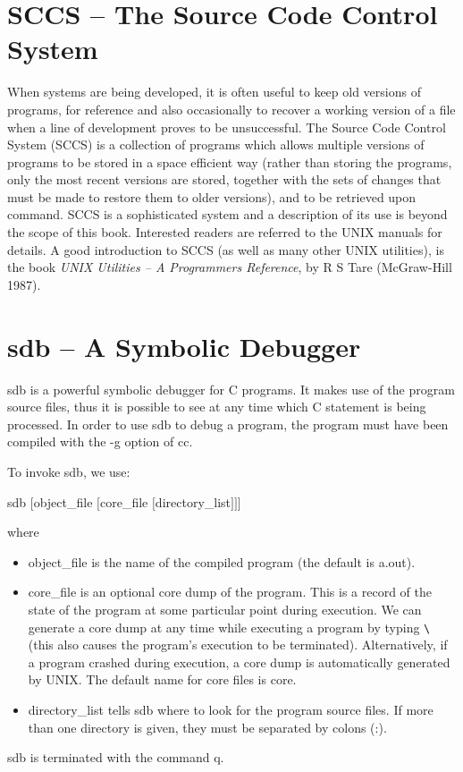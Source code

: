 \section{{\cmd SCCS} -- The Source Code Control System}
When systems are being developed, it is often useful to keep
old versions of programs, for reference and also occasionally to
recover a working version of a file when a line of development proves
to be unsuccessful. The Source Code Control System (SCCS) is a
collection of programs which allows multiple versions of programs to
be stored in a space efficient way (rather than storing the programs,
only the most recent versions are stored, together with the sets of
changes that must be made to restore them to older versions), and
to be retrieved upon command. SCCS is a sophisticated system and a
description of its use is beyond the scope of this book. Interested
readers are referred to the UNIX manuals for details. A good
introduction to SCCS (as well as many other UNIX utilities), is the
book {\em UNIX Utilities -- A Programmers Reference}, by R S Tare
(McGraw-Hill 1987).

\section{{\cmd sdb} -- A Symbolic Debugger}
     {\cmd sdb} is  a powerful  symbolic debugger for C programs. It
makes use of the program source  files, thus  it is possible to see
at any time which C statement is being processed. In order to  use
{\cmd sdb} to debug a program, the program must have been compiled
with the {\cmd -g} option of {\cmd cc.}

     To invoke {\cmd sdb}, we use:
\begin{display}\cmd
sdb $[${\ms object\_file\/} $[${\ms core\_file\/} $[${\ms directory\_list\/}$]]]$
\end{display}
\noindent
where
\begin{itemize}
\item[]  {\ms object\_file\/} is the name of the compiled program (the
default is {\fn a.out}).
\item[]  {\ms core\_file\/}  is an optional core dump of the program.
This is a record of the state  of the  program at  some particular
point during execution. We can generate a  core dump  at any  time
while executing a program by typing \CTRL \verb+\+ (this also  causes
the program's execution to be terminated). Alternatively, if a program
crashed  during execution,  a core  dump is automatically generated
by UNIX. The default name for core files is {\fn core}.
\item[]   {\ms directory\_list\/} tells  {\cmd sdb} where  to look  for the
program  source files. If  more than  one directory is given, they
must be separated by colons (:).
\end{itemize}
 {\cmd sdb} is terminated with the command {\cd q}.

